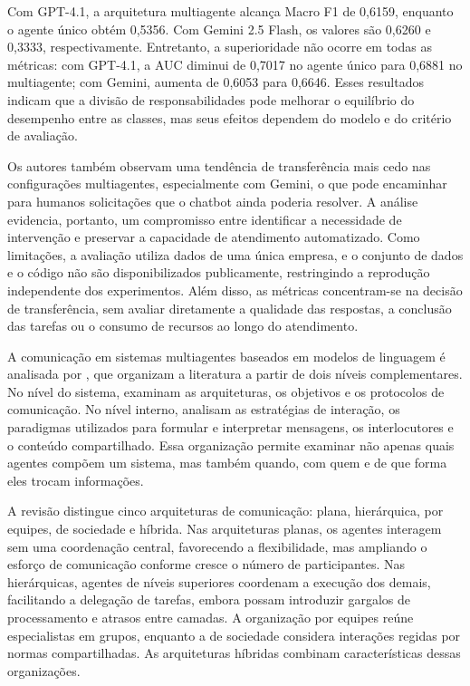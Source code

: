 Com GPT-4.1, a arquitetura multiagente alcança Macro F1 de 0,6159, enquanto o agente único obtém 0,5356. Com Gemini 2.5 Flash, os valores são 0,6260 e 0,3333, respectivamente. Entretanto, a superioridade não ocorre em todas as métricas: com GPT-4.1, a AUC diminui de 0,7017 no agente único para 0,6881 no multiagente; com Gemini, aumenta de 0,6053 para 0,6646. Esses resultados indicam que a divisão de responsabilidades pode melhorar o equilíbrio do desempenho entre as classes, mas seus efeitos dependem do modelo e do critério de avaliação.

Os autores também observam uma tendência de transferência mais cedo nas configurações multiagentes, especialmente com Gemini, o que pode encaminhar para humanos solicitações que o chatbot ainda poderia resolver. A análise evidencia, portanto, um compromisso entre identificar a necessidade de intervenção e preservar a capacidade de atendimento automatizado. Como limitações, a avaliação utiliza dados de uma única empresa, e o conjunto de dados e o código não são disponibilizados publicamente, restringindo a reprodução independente dos experimentos. Além disso, as métricas concentram-se na decisão de transferência, sem avaliar diretamente a qualidade das respostas, a conclusão das tarefas ou o consumo de recursos ao longo do atendimento.

A comunicação em sistemas multiagentes baseados em modelos de linguagem é analisada por \textcite{yan2026}, que organizam a literatura a partir de dois níveis complementares. No nível do sistema, examinam as arquiteturas, os objetivos e os protocolos de comunicação. No nível interno, analisam as estratégias de interação, os paradigmas utilizados para formular e interpretar mensagens, os interlocutores e o conteúdo compartilhado. Essa organização permite examinar não apenas quais agentes compõem um sistema, mas também quando, com quem e de que forma eles trocam informações.

A revisão distingue cinco arquiteturas de comunicação: plana, hierárquica, por equipes, de sociedade e híbrida. Nas arquiteturas planas, os agentes interagem sem uma coordenação central, favorecendo a flexibilidade, mas ampliando o esforço de comunicação conforme cresce o número de participantes. Nas hierárquicas, agentes de níveis superiores coordenam a execução dos demais, facilitando a delegação de tarefas, embora possam introduzir gargalos de processamento e atrasos entre camadas. A organização por equipes reúne especialistas em grupos, enquanto a de sociedade considera interações regidas por normas compartilhadas. As arquiteturas híbridas combinam características dessas organizações.

